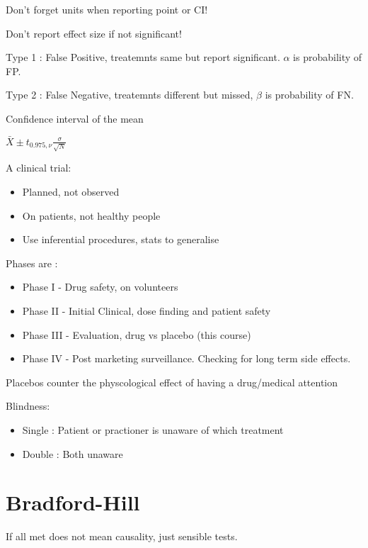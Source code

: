 \documentclass[
  letterpaper,
  DIV=11,
  numbers=noendperiod]{scrreprt}
\providecommand{\tightlist}{%
  \setlength{\itemsep}{0pt}\setlength{\parskip}{0pt}}\usepackage{longtable,booktabs,array}
\begin{document}
Don't forget units when reporting point or CI!

Don't report effect size if not significant!

Type 1 : False Positive, treatemnts same but report significant.
\(\alpha\) is probability of FP.

Type 2 : False Negative, treatemnts different but missed, \(\beta\) is
probability of FN.

Confidence interval of the mean

\(\bar{X} \pm t_{0.975, \nu} \frac{\sigma}{\sqrt{N}}\)

A clinical trial:

\begin{itemize}
\tightlist
\item
  Planned, not observed
\item
  On patients, not healthy people
\item
  Use inferential procedures, stats to generalise
\end{itemize}

Phases are :

\begin{itemize}
\tightlist
\item
  Phase I - Drug safety, on volunteers
\item
  Phase II - Initial Clinical, dose finding and patient safety
\item
  Phase III - Evaluation, drug vs placebo (this course)
\item
  Phase IV - Post marketing surveillance. Checking for long term side
  effects.
\end{itemize}

Placebos counter the physcological effect of having a drug/medical
attention

Blindness:

\begin{itemize}
\tightlist
\item
  Single : Patient or practioner is unaware of which treatment
\item
  Double : Both unaware
\end{itemize}

\hypertarget{bradford-hill}{%
\section{Bradford-Hill}\label{bradford-hill}}

If all met does not mean causality, just sensible tests.
\end{document}
